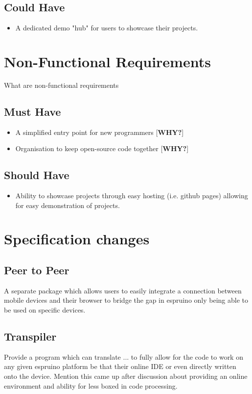 \documentclass{l4proj}
\begin{document}
\subsection{Could Have}
\begin{itemize}
    \item A dedicated demo "hub" for users to showcase their projects.
\end{itemize}
\section{Non-Functional Requirements}
\text What are non-functional requirements
\subsection{Must Have}
\begin{itemize}
    \item A simplified entry point for new programmers [\textbf{WHY?}]
    \item Organisation to keep open-source code together [\textbf{WHY?}]
\end{itemize} 
\subsection{Should Have}
\begin{itemize}
    \item Ability to showcase projects through easy hosting (i.e. github pages) allowing for easy demonstration of projects.
\end{itemize} 

\section{Specification changes}
\subsection{Peer to Peer}
\text A separate package which allows users to easily integrate a connection between mobile devices and their browser to bridge the gap in espruino only being able to be used on specific devices.

\subsection{Transpiler}
\text Provide a program which can translate ... to fully allow for the code to work on any given espruino platform be that their online IDE or even directly written onto the device. Mention this came up after discussion about providing an online environment and ability for less boxed in code processing.
\end{document}
